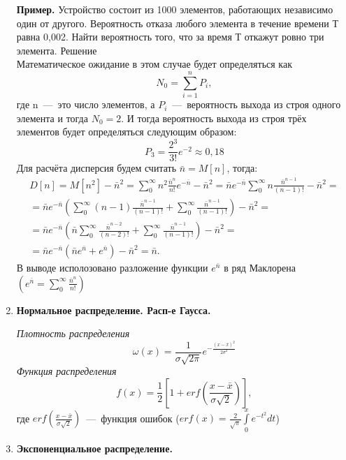 \documentclass[14pt,a4paper]{article}
\begin{document}
\begin{enumerate}
    \textbf{Пример.} Устройство состоит из 1000 элементов, работающих независимо один от другого. Вероятность отказа любого элемента в течение времени Т равна 0,002. Найти вероятность того, что за время Т откажут ровно три элемента.
    Решение\\
    Математическое ожидание в этом случае будет определяться как
    \begin{equation}
        N_0 = \sum_{i=1}^{n} P_i,
    \end{equation} 
    где n~---~это число элементов, а $P_i$~---~вероятность выхода из строя одного элемента и тогда $N_0 = 2$. И тогда вероятность выхода из строя трёх элементов будет определяться следующим образом:
    \begin{equation}
        P_3 = \frac{2^3}{3!}e^{-2} \approx 0,18 
    \end{equation} 
    Для расчёта дисперсия будем считать $\bar{n} = M[n]$, тогда:
    \begin{multline}
        D[n] = M[n^2] - \bar{n}^2 = \sum\limits_0^\infty n^2 \frac{\bar{n}^n}{n!}e^{-\bar{n}} - \bar{n}^2 = \bar{n}e^{-\bar{n}}\sum\limits_0^\infty n \frac{\bar{n}^{n-1}}{(n-1)!} - \bar{n}^2 = \\ = \bar{n}e^{-\bar{n}} \left (\sum\limits_0^\infty (n - 1)\frac{\bar{n}^{n-1}}{(n-1)!} + \sum\limits_0^\infty \frac{\bar{n}^{n-1}}{(n-1)!}\right ) - \bar{n}^2 = \\ = \bar{n}e^{-\bar{n}} \left (\bar{n}\sum\limits_0^\infty \frac{\bar{n}^{n-2}}{(n-2)!} + \sum\limits_0^\infty \frac{\bar{n}^{n-1}}{(n-1)!}\right ) - \bar{n}^2 = \\ = \bar{n}e^{-\bar{n}}(\bar{n}e^{\bar{n}}+e^{\bar{n}}) - \bar{n}^2 = \bar{n}.
    \end{multline}
    В выводе исполозовано разложение функции $e^{\bar{n}}$ в ряд Маклорена $\left (e^{\bar{n}} = \sum_0^\infty\frac{\bar{n}^n}{n!}\right )$
    \item \textbf{Нормальное распределение. Расп-е Гаусса.}
    
    \textit{Плотность распределения}
    \begin{equation}
        \omega(x) = \frac{1}{\sigma \sqrt{2\pi}}e^{-\frac{(x-\bar{x})^2}{2\sigma^2}}
    \end{equation}
    \textit{Функция распределения}
    \begin{equation}
        f(x) = \frac{1}{2}\left [ 1 + erf \left (\frac{x-\bar{x}}{\sigma \sqrt{2}} \right ) \right ],
    \end{equation}
    где $erf(\frac{x-\bar{x}}{\sigma \sqrt{2}})$~---~функция ошибок ($erf(x) = \frac{2}{\sqrt{\pi}}\int\limits_{0}^{x} e^{-t^2}dt$)
    \item \textbf{Экспоненциальное распределение.}
    

\end{enumerate}
\end{document}
